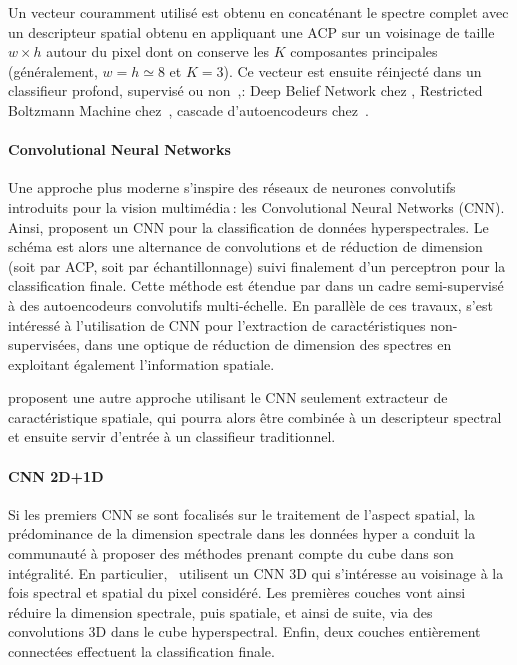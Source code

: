 Un vecteur couramment utilisé est obtenu en concaténant le spectre complet avec un descripteur spatial obtenu en appliquant une ACP sur un voisinage de taille $w\times{h}$ autour du pixel dont on conserve les $K$ composantes principales (généralement, $w = h \simeq 8$ et $K = 3$). Ce vecteur est ensuite réinjecté dans un classifieur profond, supervisé ou non~,: Deep Belief Network chez \cite{li_classification_2014,chen_spectral-spatial_2015}, Restricted Boltzmann Machine chez~\cite{lin_spectral-spatial_2013,midhun_deep_2014}, cascade d'autoencodeurs chez~\cite{chen_deep_2014,ma_spectral-spatial_2016,tao_unsupervised_2015,wang_spectralspatial_2017}.

\paragraph{Convolutional Neural Networks} Une approche plus moderne s'inspire des réseaux de neurones convolutifs introduits pour la vision multimédia\,: les Convolutional Neural Networks (CNN). Ainsi, \cite{makantasis_deep_2015,slavkovikj_hyperspectral_2015} proposent un CNN pour la classification de données hyperspectrales. Le schéma est alors une alternance de convolutions et de réduction de dimension (soit par ACP, soit par échantillonnage) suivi finalement d'un perceptron pour la classification finale. Cette méthode est étendue par \cite{zhao_combining_2015} dans un cadre semi-supervisé à des autoencodeurs convolutifs multi-échelle.
En parallèle de ces travaux, \cite{romero_unsupervised_2016} s'est intéressé à l'utilisation de CNN pour l'extraction de caractéristiques non-supervisées, dans une optique de réduction de dimension des spectres en exploitant également l'information spatiale.

\cite{zhao_spectral-spatial_2016,yue_spectral-spatial_2015} proposent une autre approche utilisant le CNN seulement extracteur de caractéristique spatiale, qui pourra alors être combinée à un descripteur spectral et ensuite servir d'entrée à un classifieur traditionnel.

\paragraph{CNN 2D+1D} Si les premiers CNN se sont focalisés sur le traitement de l'aspect spatial, la prédominance de la dimension spectrale dans les données hyper a conduit la communauté à proposer des méthodes prenant compte du cube dans son intégralité. En particulier,~\cite{ben_hamida_deep_2016,chen_deep_2016,slavkovikj_hyperspectral_2015} utilisent un CNN 3D qui s'intéresse au voisinage à la fois spectral et spatial du pixel considéré. Les premières couches vont ainsi réduire la dimension spectrale, puis spatiale, et ainsi de suite, via des convolutions 3D dans le cube hyperspectral. Enfin, deux couches entièrement connectées effectuent la classification finale.

